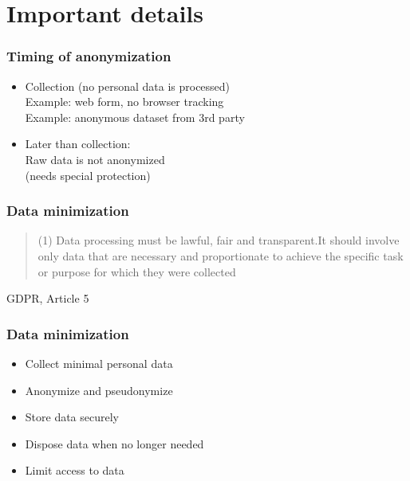 \documentclass[17pt,aspectratio=169,hyperref={pdfusetitle,colorlinks,allcolors=olive}]{beamer}
\begin{document}
\section{Important details}

\begin{frame}[fragile]
  \frametitle{Timing of anonymization}

  \begin{itemize}
  \item Collection (no personal data is processed) \\
    Example: web form, no browser tracking \\
    Example: anonymous dataset from 3rd party \\
  \item Later than collection: \\
    Raw data is not anonymized \\
    (needs special protection) \\
  \end{itemize}
  
\end{frame}

\begin{frame}[fragile]
  \frametitle{Data minimization}

  \begin{quote}
  (1) Data  processing  must  be  lawful,  fair  and  transparent.It  should  involve  only  data  that  are  necessary  and proportionate to achieve the specific task or purpose for which they were collected
  \end{quote}

  \begin{flushright}
    GDPR, Article 5
  \end{flushright}
\end{frame}

\begin{frame}[fragile]
  \frametitle{Data minimization}

  \begin{itemize}
  \item Collect minimal personal data
  \item Anonymize and pseudonymize
  \item Store data securely
  \item Dispose data when no longer needed
  \item Limit access to data
  \end{itemize}
\end{frame}
\end{document}
